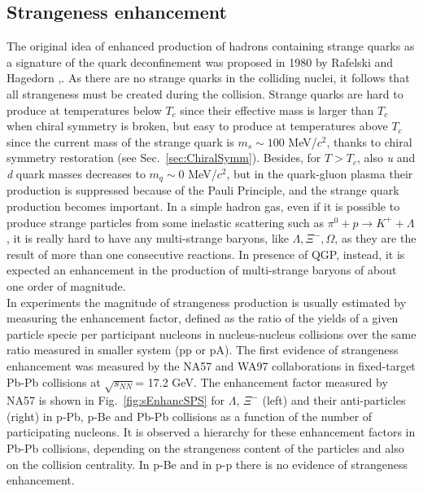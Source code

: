 \subsection{Strangeness enhancement}
\label{subsec:StrangEnhancSPS}
The original idea of enhanced production of hadrons containing strange quarks as a signature of the quark deconfinement was proposed in 1980 by Rafelski and Hagedorn \cite{PhysRevLett.48.1066},\cite{Muller:2011tu}. As there are no strange quarks in the colliding nuclei, it follows that all strangeness must be created during the collision. Strange quarks are hard to produce at temperatures below $T_c$ since their effective mass is larger than $T_c$ when chiral symmetry is broken, but easy to produce at temperatures above $T_c$ since the current mass of the strange quark is $m_s \sim 100$ MeV/$c^2$, thanks to chiral symmetry restoration (see Sec.~\ref{sec:ChiralSymm}). Besides, for $T > T_c$, also \textit{u} and \textit{d} quark masses decreases to $m_q \sim 0$ MeV/$c^2$, but in the quark-gluon plasma their production is suppressed because of the Pauli Principle, and the strange quark production becomes important. In a simple hadron gas, even if it is possible to produce strange particles from some inelastic scattering such as $\pi^0+p \rightarrow K^++\Lambda$, it is really hard to have any multi-strange baryons, like $\Lambda , \Xi ^-,\Omega$, as they are the result of more than one consecutive reactions. In presence of QGP, instead, it is expected an enhancement in the production of multi-strange baryons of about one order of magnitude. \\In experiments the magnitude of strangeness production is usually estimated by measuring the enhancement factor, defined as the ratio of the yields of a given particle specie per participant nucleons in nucleus-nucleus collisions over the same ratio measured in smaller system (pp or pA). The first evidence of strangeness enhancement was measured by the NA57 and WA97 collaborations \cite{Sandor:2004bg} in fixed-target Pb-Pb collisions at $\sqrt{s_{NN}}$= 17.2 GeV. The enhancement factor measured by NA57 is shown in Fig.~\ref{fig:sEnhancSPS} for $\Lambda$, $\Xi^-$ (left) and their anti-particles (right) in p-Pb, p-Be and Pb-Pb collisions as a function of the number of participating nucleons. It is observed a hierarchy for these enhancement factors in Pb-Pb collisions, depending on the strangeness content of the particles and also on the collision centrality. In p-Be and in p-p there is no evidence of strangeness enhancement. 

